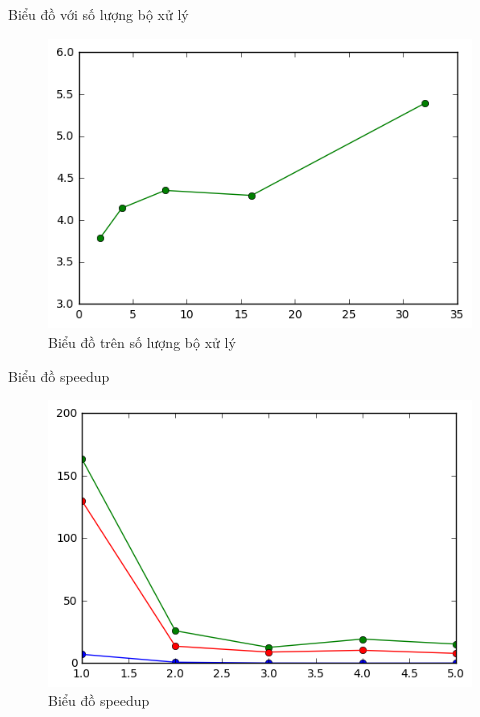 \documentclass{beamer}
\begin{document}
\begin{frame}{Biểu đồ  với số lượng bộ xử lý}
\begin{figure}[H]
\includegraphics[scale=0.4]{qs.png}
\caption{Biểu đồ trên số lượng bộ xử lý}
\end{figure}
\end{frame}
\begin{frame}{Biểu đồ speedup}
\begin{figure}[H]
\includegraphics[scale=0.4]{sp.png}
\caption{Biểu đồ speedup}
\end{figure}

\end{frame}
\end{document}
